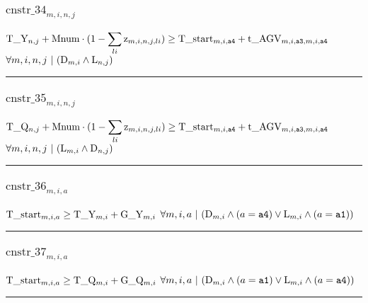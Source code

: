 \documentclass[11pt]{article}
\begin{document}
\subsubsection*{$\text{cnstr\_34}_{m, i, n, j}$} \label{cnstr_34}
$
\textcolor{black}{\text{T\_Y}}_{n, j} + \textcolor{black}{\text{Mnum}} \cdot  ( 1 - \displaystyle \sum_{li}\textcolor{black}{\text{z}}_{m, i, n, j, li} )  \geq \textcolor{black}{\text{T\_start}}_{m, i, \texttt{a4}} + \textcolor{black}{\text{t\_AGV}}_{m, i, \texttt{a3}, m, i, \texttt{a4}}
$
\hfill
$
\forall{ m, i, n, j}  ~ | ~ ( \textcolor{black}{\text{D}}_{m, i} \wedge \textcolor{black}{\text{L}}_{n, j} )
$ \vspace{5pt}
\hrule 
\subsubsection*{$\text{cnstr\_35}_{m, i, n, j}$} \label{cnstr_35}
$
\textcolor{black}{\text{T\_Q}}_{n, j} + \textcolor{black}{\text{Mnum}} \cdot  ( 1 - \displaystyle \sum_{li}\textcolor{black}{\text{z}}_{m, i, n, j, li} )  \geq \textcolor{black}{\text{T\_start}}_{m, i, \texttt{a4}} + \textcolor{black}{\text{t\_AGV}}_{m, i, \texttt{a3}, m, i, \texttt{a4}}
$
\hfill
$
\forall{ m, i, n, j}  ~ | ~ ( \textcolor{black}{\text{L}}_{m, i} \wedge \textcolor{black}{\text{D}}_{n, j} )
$ \vspace{5pt}
\hrule 
\subsubsection*{$\text{cnstr\_36}_{m, i, a}$} \label{cnstr_36}
$
\textcolor{black}{\text{T\_start}}_{m, i, a} \geq \textcolor{black}{\text{T\_Y}}_{m, i} + \textcolor{black}{\text{G\_Y}}_{m, i}
$
\hfill
$
\forall{ m, i, a}  ~ | ~ ( \textcolor{black}{\text{D}}_{m, i} \wedge  ( a = \texttt{a4}  )  \vee \textcolor{black}{\text{L}}_{m, i} \wedge  ( a = \texttt{a1}  )  )
$ \vspace{5pt}
\hrule 
\subsubsection*{$\text{cnstr\_37}_{m, i, a}$} \label{cnstr_37}
$
\textcolor{black}{\text{T\_start}}_{m, i, a} \geq \textcolor{black}{\text{T\_Q}}_{m, i} + \textcolor{black}{\text{G\_Q}}_{m, i}
$
\hfill
$
\forall{ m, i, a}  ~ | ~ ( \textcolor{black}{\text{D}}_{m, i} \wedge  ( a = \texttt{a1}  )  \vee \textcolor{black}{\text{L}}_{m, i} \wedge  ( a = \texttt{a4}  )  )
$ \vspace{5pt}
\hrule 
\end{document}
